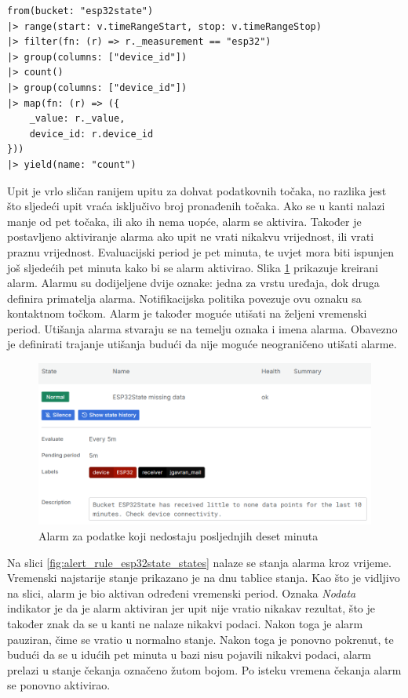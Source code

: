 \begin{lstlisting}[caption={Upit za alarm o nedostatku podataka}, language=flux]
from(bucket: "esp32state")
|> range(start: v.timeRangeStart, stop: v.timeRangeStop)
|> filter(fn: (r) => r._measurement == "esp32")
|> group(columns: ["device_id"])
|> count()
|> group(columns: ["device_id"])
|> map(fn: (r) => ({ 
	_value: r._value,
	device_id: r.device_id
}))
|> yield(name: "count")
\end{lstlisting}

Upit je vrlo sličan ranijem upitu za dohvat podatkovnih točaka, no razlika jest što sljedeći upit vraća isključivo broj pronađenih točaka. Ako se u kanti nalazi manje od pet točaka, ili ako ih nema uopće, alarm se aktivira. Također je postavljeno aktiviranje alarma ako upit ne vrati nikakvu vrijednost, ili vrati praznu vrijednost. Evaluacijski period je pet minuta, te uvjet mora biti ispunjen još sljedećih pet minuta kako bi se alarm aktivirao. Slika \ref{fig:alert_rule_esp32state} prikazuje kreirani alarm. Alarmu su dodijeljene dvije oznake: jedna za vrstu uređaja, dok druga definira primatelja alarma. Notifikacijska politika povezuje ovu oznaku sa kontaktnom točkom. Alarm je također moguće utišati na željeni vremenski period. Utišanja alarma  stvaraju se na temelju oznaka i imena alarma. Obavezno je definirati trajanje utišanja budući da nije moguće neograničeno utišati alarme. 

\begin{figure}[ht]
	\centering
	\includegraphics[scale=0.6]{imgs/alert_rule_esp32state}
	\caption{Alarm za podatke koji nedostaju posljednjih deset minuta}
	\label{fig:alert_rule_esp32state}
\end{figure}

Na slici \ref{fig:alert_rule_esp32state_states} nalaze se stanja alarma kroz vrijeme. Vremenski najstarije stanje prikazano je na dnu tablice stanja. Kao što je vidljivo na slici, alarm je bio aktivan određeni vremenski period. Oznaka \textit{Nodata} indikator je da je alarm aktiviran jer upit nije vratio nikakav rezultat, što je također znak da se u kanti ne nalaze nikakvi podaci. Nakon toga je alarm pauziran, čime se vratio u normalno stanje. Nakon toga je ponovno pokrenut, te budući da se u idućih pet minuta u bazi nisu pojavili nikakvi podaci, alarm prelazi u stanje čekanja označeno žutom bojom. Po isteku vremena čekanja alarm se ponovno aktivirao. 

